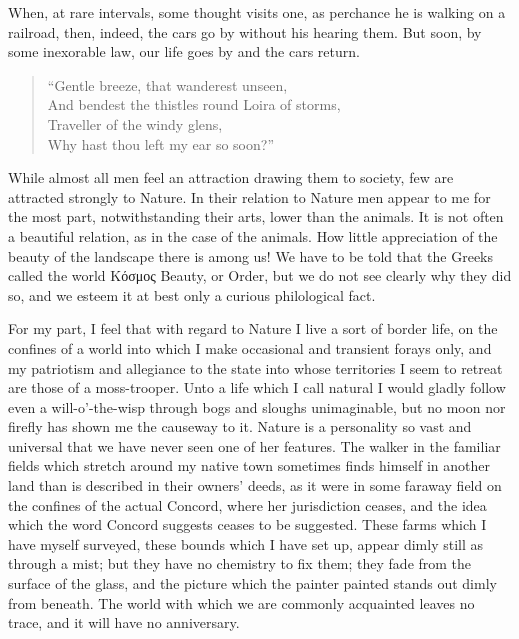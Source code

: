 \documentclass[twoside,openright,10pt]{memoir} %
\begin{document}
When, at rare intervals, some thought visits one, as perchance he is walking on a railroad, then, indeed, the cars go by without his hearing them. But soon, by some inexorable law, our life goes by and the cars return.

\begin{verse}
“Gentle breeze, that wanderest unseen,\\
And bendest the thistles round Loira of storms,\\
Traveller of the windy glens,\\
Why hast thou left my ear so soon?”
\end{verse}

While almost all men feel an attraction drawing them to society, few are attracted strongly to Nature. In their relation to Nature men appear to me for the most part, notwithstanding their arts, lower than the animals. It is not often a beautiful relation, as in the case of the animals. How little appreciation of the beauty of the landscape there is among us! We have to be told that the Greeks called the world \EBGaramond{}Κόσμος \normalfont Beauty, or Order, but we do not see clearly why they did so, and we esteem it at best only a curious philological fact.

For my part, I feel that with regard to Nature I live a sort of border life, on the confines of a world into which I make occasional and transient forays only, and my patriotism and allegiance to the state into whose territories I seem to retreat are those of a moss-trooper. Unto a life which I call natural I would gladly follow even a will-o’-the-wisp through bogs and sloughs unimaginable, but no moon nor firefly has shown me the causeway to it. Nature is a personality so vast and universal that we have never seen one of her features. The walker in the familiar fields which stretch around my native town sometimes finds himself in another land than is described in their owners’ deeds, as it were in some faraway field on the confines of the actual Concord, where her jurisdiction ceases, and the idea which the word Concord suggests ceases to be suggested. These farms which I have myself surveyed, these bounds which I have set up, appear dimly still as through a mist; but they have no chemistry to fix them; they fade from the surface of the glass, and the picture which the painter painted stands out dimly from beneath. The world with which we are commonly acquainted leaves no trace, and it will have no anniversary.
\end{document}
